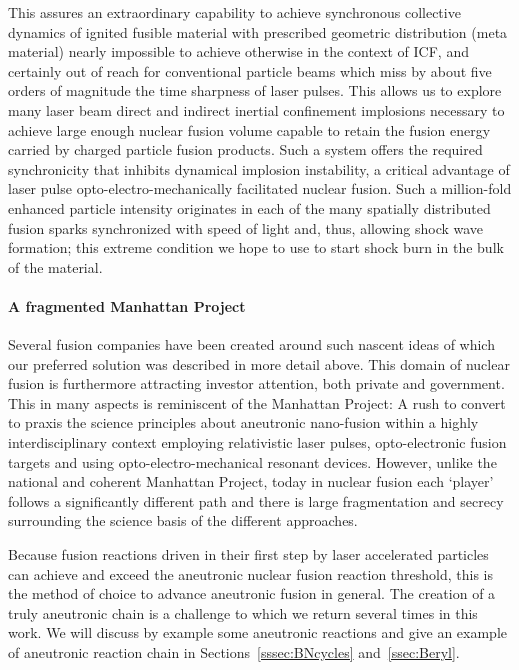 \documentclass[particles,article,accept,pdftex,moreauthors]{Definitions/mdpi}
\begin{document}
This assures an extraordinary capability to achieve synchronous collective dynamics of ignited fusible material with prescribed geometric distribution (meta material) nearly impossible to achieve otherwise in the context of ICF, and certainly out of reach for conventional particle beams which miss by about five orders of magnitude the time sharpness of laser pulses. This allows us to explore many laser beam direct and indirect inertial confinement implosions necessary to achieve large enough nuclear fusion volume capable to retain the fusion energy carried by charged particle fusion products. Such a system offers the required synchronicity that inhibits dynamical implosion instability, a critical advantage of laser pulse opto-electro-mechanically facilitated nuclear fusion. Such a million-fold enhanced particle intensity originates in each of the many spatially distributed fusion sparks synchronized with speed of light and, thus, allowing shock wave formation; this extreme condition we hope to use to start shock burn in the bulk of the material.

\paragraph*{\bf A fragmented Manhattan Project}
Several fusion companies have been created around such nascent ideas of which our preferred solution was described in more detail above. This domain of nuclear fusion is furthermore attracting investor attention, both private and government. This in many aspects is reminiscent of the Manhattan Project: A rush to convert to praxis the science principles about aneutronic nano-fusion within a highly interdisciplinary context employing relativistic laser pulses, opto-electronic fusion targets and using opto-electro-mechanical resonant devices. However, unlike the national and coherent Manhattan Project, today in nuclear fusion each `player' follows a significantly different path and there is large fragmentation and secrecy surrounding the science basis of the different approaches.

Because fusion reactions driven in their first step by laser accelerated particles can achieve and exceed the aneutronic nuclear fusion reaction threshold, this is the method of choice to advance aneutronic fusion in general. The creation of a truly aneutronic chain is a challenge to which we return several times in this work. We will discuss by example some aneutronic reactions and give an example of aneutronic reaction chain in Sections~\ref{sssec:BNcycles} and~\ref{ssec:Beryl}.
 
\end{document}

